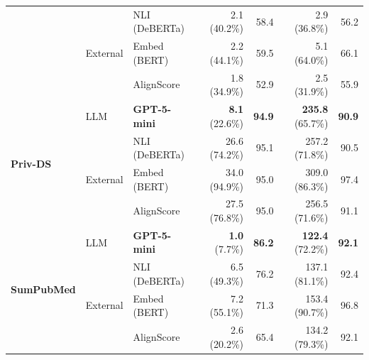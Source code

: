 \begin{table}[t]
\begin{tabular}{lll rr rr}
\addlinespace[2pt]
   & \multirow{3}{*}{External} & NLI (DeBERTa) & 2.1 (40.2\%) & 58.4 & 2.9 (36.8\%) & 56.2 \\
   &  & Embed (BERT) & 2.2 (44.1\%) & 59.5 & 5.1 (64.0\%) & 66.1 \\
   &  & AlignScore & 1.8 (34.9\%) & 52.9 & 2.5 (31.9\%) & 55.9 \\
\midrule
  \multirow{4}{*}{\textbf{Priv-DS}} & LLM & \textbf{GPT-5-mini} & \textbf{8.1} (22.6\%) & \textbf{94.9} & \textbf{235.8} (65.7\%) & \textbf{90.9} \\
\addlinespace[2pt]
   & \multirow{3}{*}{External} & NLI (DeBERTa) & 26.6 (74.2\%) & 95.1 & 257.2 (71.8\%) & 90.5 \\
   &  & Embed (BERT) & 34.0 (94.9\%) & 95.0 & 309.0 (86.3\%) & 97.4 \\
   &  & AlignScore & 27.5 (76.8\%) & 95.0 & 256.5 (71.6\%) & 91.1 \\
\midrule
  \multirow{4}{*}{\textbf{SumPubMed}} & LLM & \textbf{GPT-5-mini} & \textbf{1.0} (7.7\%) & \textbf{86.2} & \textbf{122.4} (72.2\%) & \textbf{92.1} \\
\addlinespace[2pt]
   & \multirow{3}{*}{External} & NLI (DeBERTa) & 6.5 (49.3\%) & 76.2 & 137.1 (81.1\%) & 92.4 \\
   &  & Embed (BERT) & 7.2 (55.1\%) & 71.3 & 153.4 (90.7\%) & 96.8 \\
   &  & AlignScore & 2.6 (20.2\%) & 65.4 & 134.2 (79.3\%) & 92.1 \\
\bottomrule
\end{tabular}
\end{table}